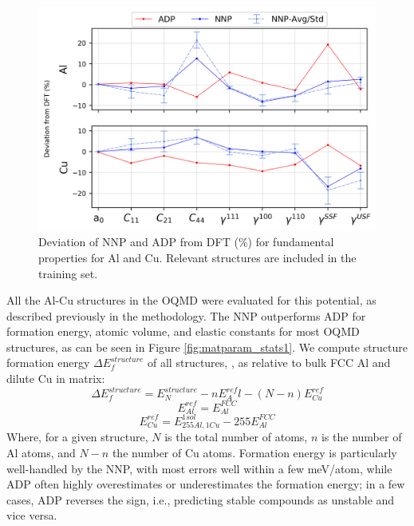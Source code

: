 \documentclass{article}
\begin{document}
\begin{figure}[H]%
\centering%
\includegraphics[width=1\textwidth,center]{./figures/matparam_purestats.png}%
\caption{Deviation of NNP and ADP from DFT (\%) for fundamental properties for Al and Cu. 
Relevant structures are included in the training set. }%
\label{fig:matparam_purestats}
\end{figure}
All the Al-Cu structures in the OQMD were evaluated for this potential, as described previously in the methodology.
The NNP outperforms ADP for formation energy, atomic volume, and elastic constants for most OQMD structures, as can be seen in Figure \ref{fig:matparam_stats1}.
We compute structure formation energy $\Delta E^{structure}_f$ of all structures,
, as relative to bulk FCC Al and dilute Cu in matrix:
\begin{equation} \label{eqn:formE_structure}
\Delta E^{structure}_f = E^{structure}_N - nE^{ref}_Al-(N-n)E^{ref}_{Cu}
\end{equation}
\begin{equation} \label{eqn:formRef_Al}
E^{ref}_{Al} = E^{FCC}_{Al}
\end{equation}
\begin{equation} \label{eqn:formRef_Cu}
E^{ref}_{Cu} = E^{1sol}_{255Al,1Cu} - 255E^{FCC}_{Al}
\end{equation}
Where, for a given structure, $N$ is the total number of atoms, $n$ is the number of Al atoms, and $N-n$ the number of Cu atoms. Formation energy is particularly well-handled by the NNP, with most errors well within a few meV/atom, while ADP often highly overestimates or underestimates the formation energy;
in a few cases, ADP reverses the sign, i.e., predicting stable compounds as unstable and vice versa.
\end{document}
